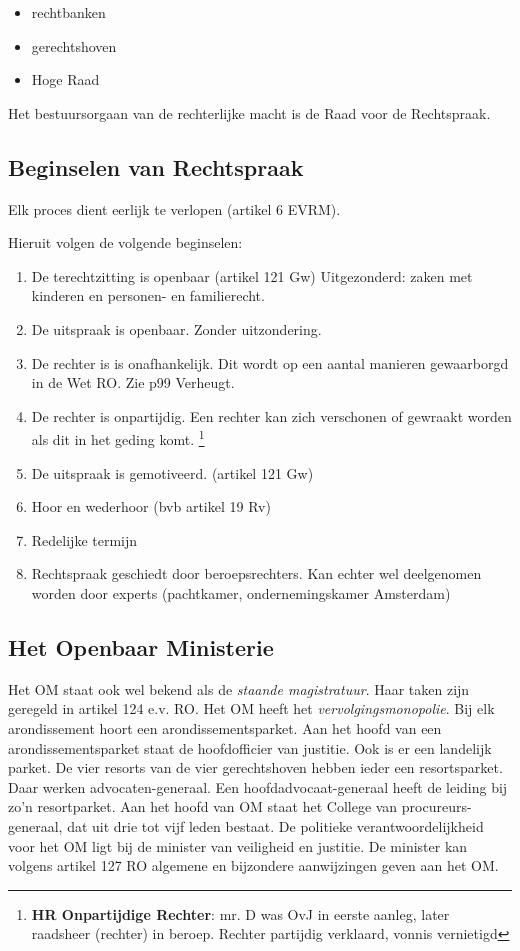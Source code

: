 \documentclass{article}
\begin{document}
\begin{itemize}
  \item rechtbanken
  \item gerechtshoven
  \item Hoge Raad
\end{itemize}

Het bestuursorgaan van de rechterlijke macht is de Raad voor de Rechtspraak.

\subsection{Beginselen van Rechtspraak}
\label{beginselenrechtspraak}
Elk proces dient eerlijk te verlopen (artikel 6 EVRM).

Hieruit volgen de volgende beginselen:

\begin{enumerate}
  \item De terechtzitting is openbaar (artikel 121 Gw) Uitgezonderd: zaken met
    kinderen en personen- en familierecht.
  \item De uitspraak is openbaar. Zonder uitzondering.
  \item De rechter is is onafhankelijk. Dit wordt op een aantal manieren gewaarborgd
    in de Wet RO. Zie p99 Verheugt.
  \item De rechter is onpartijdig. Een rechter kan zich verschonen of gewraakt worden
    als dit in het geding komt. \footnote{\textbf{HR Onpartijdige Rechter}: mr. D was
    OvJ in eerste aanleg, later raadsheer (rechter) in beroep. Rechter partijdig verklaard,
    vonnis vernietigd}
  \item De uitspraak is gemotiveerd. (artikel 121 Gw)
  \item Hoor en wederhoor (bvb artikel 19 Rv)
  \item Redelijke termijn
  \item Rechtspraak geschiedt door beroepsrechters. Kan echter wel deelgenomen worden
    door experts (pachtkamer, ondernemingskamer Amsterdam)
\end{enumerate}

\subsection{Het Openbaar Ministerie}

Het OM staat ook wel bekend als de \emph{staande magistratuur}. Haar taken zijn geregeld
in artikel 124 e.v. RO. Het OM heeft het \emph{vervolgingsmonopolie}. Bij elk arondissement
hoort een arondissementsparket. Aan het hoofd van een arondissementsparket staat de hoofdofficier
van justitie. Ook is er een landelijk parket. De vier resorts van de vier gerechtshoven hebben
ieder een resortsparket. Daar werken advocaten-generaal. Een hoofdadvocaat-generaal heeft de
leiding bij zo'n resortparket. Aan het hoofd van OM staat het College van procureurs-generaal,
dat uit drie tot vijf leden bestaat. De politieke verantwoordelijkheid voor het OM ligt bij
de minister van veiligheid en justitie. De minister kan volgens artikel 127 RO algemene
en bijzondere aanwijzingen geven aan het OM.
\end{document}
